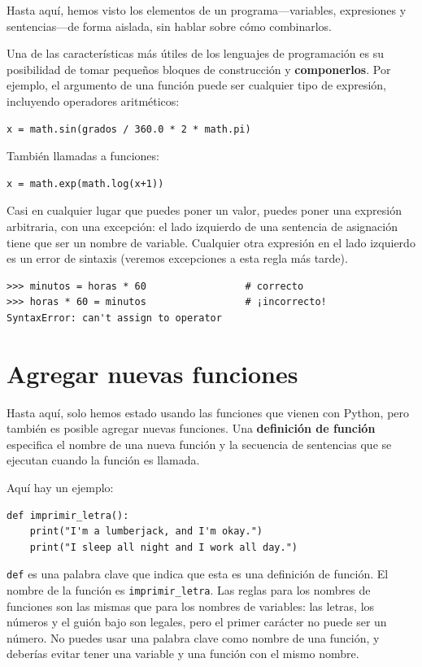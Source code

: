\documentclass[10pt]{book}
\begin{document}
Hasta aquí, hemos visto los elementos de un programa---variables,
expresiones y sentencias---de forma aislada, sin hablar sobre cómo
combinarlos.

Una de las características más útiles de los lenguajes de programación es su
posibilidad de tomar pequeños bloques de construcción y {\bf componerlos}.  Por
ejemplo, el argumento de una función puede ser cualquier tipo de expresión,
incluyendo operadores aritméticos:

\begin{verbatim}
x = math.sin(grados / 360.0 * 2 * math.pi)
\end{verbatim}
%
También llamadas a funciones:

\begin{verbatim}
x = math.exp(math.log(x+1))
\end{verbatim}
%
Casi en cualquier lugar que puedes poner un valor, puedes poner una expresión
arbitraria, con una excepción: el lado izquierdo de una sentencia
de asignación tiene que ser un nombre de variable. Cualquier otra expresión en el lado
izquierdo es un error de sintaxis (veremos excepciones a esta regla
más tarde).

\begin{verbatim}
>>> minutos = horas * 60                 # correcto
>>> horas * 60 = minutos                 # ¡incorrecto!
SyntaxError: can't assign to operator
\end{verbatim}
%


\section{Agregar nuevas funciones}

Hasta aquí, solo hemos estado usando las funciones que vienen con Python,
pero también es posible agregar nuevas funciones.
Una {\bf definición de función} especifica el nombre de una nueva función y
la secuencia de sentencias que se ejecutan cuando la función es llamada.

Aquí hay un ejemplo:

\begin{verbatim}
def imprimir_letra():
    print("I'm a lumberjack, and I'm okay.")
    print("I sleep all night and I work all day.")
\end{verbatim}
%
{\tt def} es una palabra clave que indica que esta es una definición
de función. El nombre de la función es \verb"imprimir_letra".  Las
reglas para los nombres de funciones son las mismas que para los nombres de variables: las letras,
los números y el guión bajo son legales, pero el primer carácter
no puede ser un número.  No puedes usar una palabra clave como nombre de una función,
y deberías evitar tener una variable y una función con el mismo
nombre.
\end{document}
